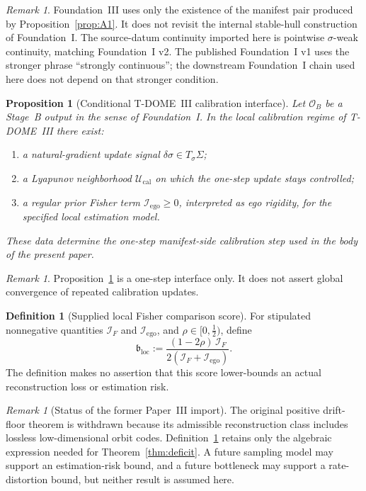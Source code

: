 \documentclass[12pt]{article}
\newtheorem{proposition}[theorem]{Proposition}
\theoremstyle{definition}
\newtheorem{definition}[theorem]{Definition}
\theoremstyle{remark}
\newtheorem{remark}[theorem]{Remark}
\begin{document}
\begin{remark}
Foundation~III uses only the existence of the manifest pair produced by
Proposition~\ref{prop:A1}. It does not revisit the internal stable-hull
construction of Foundation~I. The source-datum continuity imported here
is pointwise \(\sigma\)-weak continuity, matching Foundation~I v2. The
published Foundation~I v1 uses the stronger phrase ``strongly
continuous''; the downstream Foundation~I chain used here does not
depend on that stronger condition.
\end{remark}

\begin{proposition}[Conditional T-DOME~III calibration interface]
\label{prop:A2}
Let \(\mathcal O_B\) be a Stage~B output in the sense of
Foundation~I. In the local calibration regime of T-DOME~III there exist:
\begin{enumerate}
\item a natural-gradient update signal
  \(\delta\sigma\in T_\sigma\Sigma\);
\item a Lyapunov neighborhood \(\mathcal U_{\mathrm{cal}}\) on which the
  one-step update stays controlled;
\item a regular prior Fisher term \(\mathcal I_{\mathrm{ego}}\ge0\),
  interpreted as ego rigidity, for the specified local estimation model.
\end{enumerate}
These data determine the one-step manifest-side calibration step used in
the body of the present paper.
\end{proposition}

\begin{remark}
Proposition~\ref{prop:A2} is a one-step interface only. It does not
assert global convergence of repeated calibration updates.
\end{remark}

\begin{definition}[Supplied local Fisher comparison score]
\label{def:A3score}
For stipulated nonnegative quantities \(\mathcal I_F\) and
\(\mathcal I_{\mathrm{ego}}\), and \(\rho\in[0,\tfrac12)\), define
\[
\mathfrak b_{\mathrm{loc}}
:=
\frac{(1-2\rho)\,\mathcal I_F}
{2(\mathcal I_F+\mathcal I_{\mathrm{ego}})}.
\]
The definition makes no assertion that this score lower-bounds an actual
reconstruction loss or estimation risk.
\end{definition}

\begin{remark}[Status of the former Paper~III import]
The original positive drift-floor theorem is withdrawn because its
admissible reconstruction class includes lossless low-dimensional orbit
codes. Definition~\ref{def:A3score} retains only the algebraic expression
needed for Theorem~\ref{thm:deficit}. A future sampling model may support
an estimation-risk bound, and a future bottleneck may support a
rate-distortion bound, but neither result is assumed here.
\end{remark}
 
\end{document}
